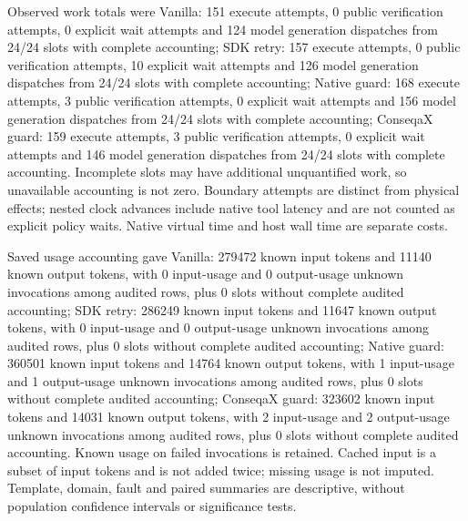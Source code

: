 Observed work totals were Vanilla: 151 execute attempts, 0 public verification attempts, 0 explicit wait attempts and 124 model generation dispatches from 24/24 slots with complete accounting; SDK retry: 157 execute attempts, 0 public verification attempts, 10 explicit wait attempts and 126 model generation dispatches from 24/24 slots with complete accounting; Native guard: 168 execute attempts, 3 public verification attempts, 0 explicit wait attempts and 156 model generation dispatches from 24/24 slots with complete accounting; ConseqaX guard: 159 execute attempts, 3 public verification attempts, 0 explicit wait attempts and 146 model generation dispatches from 24/24 slots with complete accounting. Incomplete slots may have additional unquantified work, so unavailable accounting is not zero. Boundary attempts are distinct from physical effects; nested clock advances include native tool latency and are not counted as explicit policy waits. Native virtual time and host wall time are separate costs.

Saved usage accounting gave Vanilla: 279472 known input tokens and 11140 known output tokens, with 0 input-usage and 0 output-usage unknown invocations among audited rows, plus 0 slots without complete audited accounting; SDK retry: 286249 known input tokens and 11647 known output tokens, with 0 input-usage and 0 output-usage unknown invocations among audited rows, plus 0 slots without complete audited accounting; Native guard: 360501 known input tokens and 14764 known output tokens, with 1 input-usage and 1 output-usage unknown invocations among audited rows, plus 0 slots without complete audited accounting; ConseqaX guard: 323602 known input tokens and 14031 known output tokens, with 2 input-usage and 2 output-usage unknown invocations among audited rows, plus 0 slots without complete audited accounting. Known usage on failed invocations is retained. Cached input is a subset of input tokens and is not added twice; missing usage is not imputed. Template, domain, fault and paired summaries are descriptive, without population confidence intervals or significance tests.
